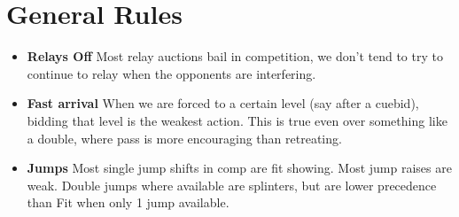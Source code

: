 \documentclass[tom-ari]{subfile}
\begin{document}
	
\chapter{General Rules}

\begin{itemize}[]
\item \textbf{Relays Off} Most relay auctions bail in competition, we don't tend to try to continue to relay when the opponents are interfering.
\item \textbf{Fast arrival} When we are forced to a certain level (say after a cuebid), bidding that level is the weakest action. This is true even over something like a double, where pass is more encouraging than retreating.
\item \textbf{Jumps} Most single jump shifts in comp are fit showing. Most jump raises are weak. Double jumps where available are splinters, but are lower precedence than Fit when only 1 jump available.
\end{itemize}

	
\end{document}
